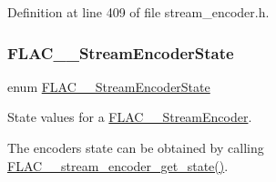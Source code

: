 Definition at line 409 of file stream\+\_\+encoder.\+h.

\mbox{\label{group__flac__stream__encoder_gac5e9db4fc32ca2fa74abd9c8a87c02a5}} 
\subsubsection{\texorpdfstring{FLAC\_\_StreamEncoderState}{FLAC\_\_StreamEncoderState}}
{\footnotesize\ttfamily enum \mbox{\hyperlink{group__flac__stream__encoder_gac5e9db4fc32ca2fa74abd9c8a87c02a5}{F\+L\+A\+C\+\_\+\+\_\+\+Stream\+Encoder\+State}}}

State values for a \mbox{\hyperlink{struct_f_l_a_c_____stream_encoder}{F\+L\+A\+C\+\_\+\+\_\+\+Stream\+Encoder}}.

The encoder\textquotesingle{}s state can be obtained by calling \mbox{\hyperlink{group__flac__stream__encoder_gaff7284e55f01b59ed8f03317df510992}{F\+L\+A\+C\+\_\+\+\_\+stream\+\_\+encoder\+\_\+get\+\_\+state()}}.

